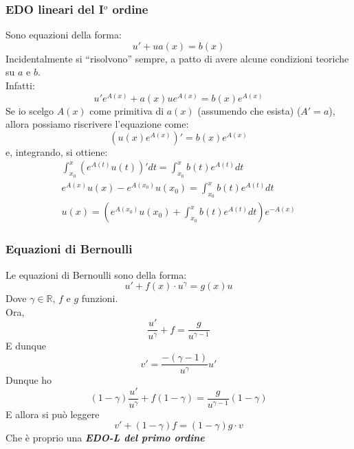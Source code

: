 \documentclass{article}
\theoremstyle{definition}
\newcommand{\R}{\mathbb{R}}
\newcommand{\virgolette}[1]{``#1''}
\begin{document}
\subsubsection{EDO lineari del I$^o$ ordine}
Sono equazioni della forma:
\begin{equation}
    u'+ua(x)=b(x)
\end{equation}
Incidentalmente si \virgolette{risolvono} sempre, a patto di avere alcune condizioni teoriche su $a$ e $b$.
\\
Infatti:
\begin{equation}
    u'e^{A(x)}+a(x)ue^{A(x)}=b(x)e^{A(x)}
\end{equation}
Se io scelgo $A(x)$ come primitiva di $a(x)$ (assumendo che esista) ($A'=a$), allora possiamo riscrivere l'equazione come:
\begin{equation}
    \left(u(x)e^{A(x)}\right)'=b(x)e^{A(x)}
\end{equation}
e, integrando, si ottiene:
\begin{align}
    \int_{x_0}^x \left(e^{A(t)}u(t)\right)'dt=\int_{x_0}^x b(t) e^{A(t)}dt \\
    e^{A(x)}u(x)-e^{A(x_0)}u(x_0)=\int_{x_0}^x b(t) e^{A(t)}dt \\
    u(x) = \left(e^{A(x_0)}u(x_0)+ \int_{x_0}^x b(t)e^{A(t)} dt\right) e ^{-A(x)}
\end{align}

\subsubsection{Equazioni di Bernoulli}
Le equazioni di Bernoulli sono della forma:
\begin{equation}
    u'+f(x) \cdot u^\gamma = g(x) u
\end{equation}
Dove $\gamma \in \R$, $f$ e $g$ funzioni.
\\
Ora, 
\begin{equation}
    \frac{u'}{u^\gamma}+f=\frac{g}{u^{\gamma -1}}
\end{equation}
E dunque 
\begin{equation}
    v'=\frac{-(\gamma-1)}{u^\gamma}u'
\end{equation}
Dunque ho
\begin{equation}
    (1-\gamma) \frac{u'}{u^\gamma}+ f(1-\gamma) = \frac{g}{u^{\gamma -1}}(1-\gamma)
\end{equation}
E allora si può leggere
\begin{equation}
v'+(1-\gamma)f=(1-\gamma) g \cdot v 
\end{equation}
Che è proprio una \textit{\textbf{EDO-L del primo ordine}}
\end{document}
